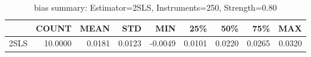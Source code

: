 \begin{table}[ht]
\centering
\caption{bias summary: Estimator=2SLS, Instruments=250, Strength=0.80}
\begin{tabular}{lrrrrrrrr}
\toprule
 & COUNT & MEAN & STD & MIN & 25\% & 50\% & 75\% & MAX \\
\midrule
2SLS & 10.0000 & 0.0181 & 0.0123 & -0.0049 & 0.0101 & 0.0220 & 0.0265 & 0.0320 \\
\bottomrule
\end{tabular}
\end{table}
